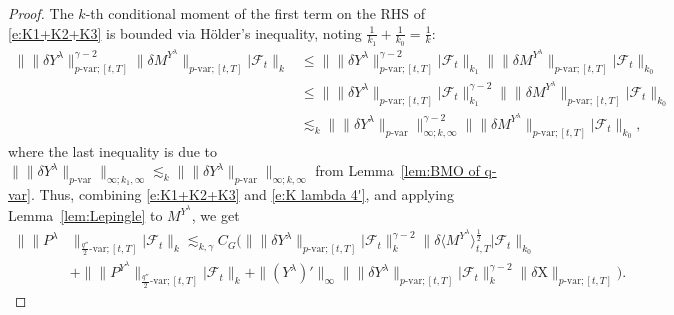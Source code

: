 \documentclass[11pt,reqno]{amsart}
\numberwithin{equation}{section}
\begin{document}
\begin{proof}
The $k$-th conditional moment of the first term on the RHS of \eqref{e:K1+K2+K3} is bounded via H\"older's inequality, noting  $\frac{1}{k_1} + \frac{1}{k_0} = \frac{1}{k}$:
\begin{equation*}
\begin{aligned}
\big\| \|\delta Y^{\lambda}\|^{\gamma - 2}_{p\text{-}\mathrm{var};[t,T]} \|\delta M^{Y^{\lambda}}\|_{p\text{-}\mathrm{var};[t,T]}\big|\mathcal F_t \big\|_k &\le \big\| \|\delta Y^{\lambda}\|^{\gamma - 2}_{p\text{-}\mathrm{var};[t,T]} \big|\mathcal F_t\big\|_{k_1} \big\| \|\delta M^{Y^{\lambda}}\|_{p\text{-}\mathrm{var};[t,T]}\big|\mathcal F_t\big\|_{k_0} \\
&\le \big\| \|\delta Y^{\lambda}\|_{p\text{-}\mathrm{var};[t,T]} \big|\mathcal F_t\big\|^{\gamma - 2}_{k_1} \big\| \|\delta M^{Y^{\lambda}}\|_{p\text{-}\mathrm{var};[t,T]}\big|\mathcal F_t\big\|_{k_0}\\
&\lesssim_k \big\| \|\delta Y^{\lambda}\|_{p\text{-}\mathrm{var}} \big\|^{\gamma - 2}_{\infty;k,\infty} \big\| \|\delta M^{Y^{\lambda}}\|_{p\text{-}\mathrm{var};[t,T]}\big|\mathcal F_t\big\|_{k_0},
\end{aligned}
\end{equation*}
where the last inequality is due to $\| \|\delta Y^{\lambda}\|_{p\text{-}\mathrm{var}} \|_{\infty;k_1,\infty} \lesssim_k \| \|\delta Y^{\lambda}\|_{p\text{-}\mathrm{var}} \|_{\infty;k,\infty}$ from Lemma~\ref{lem:BMO of q-var}.
Thus, combining \eqref{e:K1+K2+K3} and \eqref{e:K lambda 4'}, and applying Lemma~\ref{lem:Lepingle} to $M^{Y^{\lambda}}$, we get 
\begin{equation}\label{e:R^lambda'}
\begin{aligned}
\big\| \|P^{\lambda} & \|_{\frac{q''}{2}\text{-}\mathrm{var};[t,T]}  \big| \mathcal F_{t} \big\|_{k} 
\lesssim_{k,\gamma} C_G \Big( 
\big\| \|\delta Y^{\lambda}\|_{p\text{-}\mathrm{var};[t,T]} \big| \mathcal F_t \big\|^{\gamma - 2}_{k} \big\| \delta \langle M^{Y^{\lambda}}\rangle^{\frac{1}{2}}_{t,T} \big| \mathcal F_t \big\|_{k_0} \\
& + \big\| \|P^{Y^{\lambda}} \|_{\frac{q''}{2}\text{-}\mathrm{var};[t,T]} \big| \mathcal F_t \big\|_{k} + \|(Y^{\lambda})'\|_{\infty} \big\| \|\delta Y^{\lambda}\|_{p\text{-}\mathrm{var};[t,T]} \big| \mathcal F_t \big\|^{\gamma - 2}_{k} \|\delta \mathrm X\|_{p\text{-}\mathrm{var};[t,T]} \Big).
\end{aligned}
\end{equation}


\end{proof}
\end{document}
